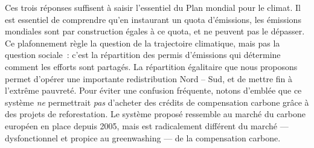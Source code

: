 \documentclass[a5paper,french]{memoir}
\begin{document}
Ces trois réponses suffisent à saisir l'essentiel du Plan mondial pour le climat. Il est essentiel de comprendre qu'en instaurant un quota d'émissions, les émissions mondiales sont par construction égales à ce quota, et ne peuvent pas le dépasser. Ce plafonnement règle la question de la trajectoire climatique, mais pas la question sociale~: c'est la répartition des permis d'émissions qui détermine comment les efforts sont partagés. La répartition égalitaire que nous proposons permet d'opérer une importante redistribution Nord -- Sud, et de mettre fin à l'extrême pauvreté. Pour éviter une confusion fréquente, notons d'emblée que ce système \textit{ne} permettrait \textit{pas} d'acheter des crédits de compensation carbone grâce à des projets de reforestation. Le système proposé ressemble au marché du carbone européen en place depuis 2005, mais est radicalement différent du marché --- dysfonctionnel et propice au greenwashing --- de la compensation carbone.
\end{document}

